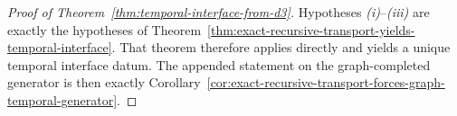 \begin{proof}[Proof of Theorem~\ref{thm:temporal-interface-from-d3}]
\label{proof:thm:temporal-interface-from-d3}
Hypotheses \emph{(i)}--\emph{(iii)} are exactly the hypotheses of
Theorem~\ref{thm:exact-recursive-transport-yields-temporal-interface}. That
theorem therefore applies directly and yields a unique temporal interface
datum. The appended statement on the graph-completed generator is then exactly
Corollary~\ref{cor:exact-recursive-transport-forces-graph-temporal-generator}.
\end{proof}

